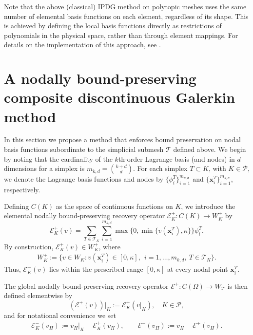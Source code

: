 \documentclass[11pt,final]{amsart}
\theoremstyle{plain}
\theoremstyle{definition}
\newcommand\bx{\boldsymbol{x}}
\newcommand\calP{{\mathcal{P}}}
\newcommand\calT{{\mathcal{T}}}
\begin{document}
Note that the above (classical) IPDG method on polytopic meshes uses
the same number of elemental basis functions on each element,
regardless of its shape. This is achieved by defining the local basis
functions directly as restrictions of polynomials in the physical
space, rather than through element mappings. For details on the
implementation of this approach, see \cite{cangiani2017hp}.


 
\section{A nodally bound-preserving composite discontinuous Galerkin method}
\label{Sec:NBP-poly}

In this section we propose a method that enforces bound preservation
on nodal basis functions subordinate to the simplicial submesh $\calT$
defined above. We begin by noting that the cardinality of the
$k$th-order Lagrange basis (and nodes) in $d$ dimensions for a simplex
is $m_{k,d}={k+d \choose d}$. For each simplex $T\subset K$, with
$K\in\calP$, we denote the Lagrange basis functions and nodes by
$\{\phi_i^T\}_{i=1}^{m_{k,d}}$ and $\{\bx_i^T\}_{i=1}^{m_{k,d}}$,
respectively.

Defining $C(K)$ as the space of continuous functions on $K$, we
introduce the elemental nodally bound-preserving recovery operator
$\mathcal{E}_{K}^+: C(K)\to W_{K}^+$ by
\begin{equation}
  \mathcal{E}_{K}^+(v)
  =\sum_{T\in\calT_K}\sum_{i=1}^{m_{k,d}}
   \max\!\big\{0,\min\{v(\bx_i^T),\kappa\}\big\}\phi_i^T.
\end{equation}
By construction, $\mathcal{E}_{K}^+(v)\in W_{K}^+$, where
\begin{align}
  W_{K}^{+}
  :=\{v\in W_{K} : v(\bx_{i}^T)\in[0,\kappa],
   \ \ i=1,\ldots,m_{k,d}, \ T\in\calT_K\}. \label{eq16}
\end{align}
Thus, $\mathcal{E}_{K}^+(v)$ lies within the prescribed range
$[0,\kappa]$ at every nodal point $\bx_i^T$.  

The global nodally bound-preserving recovery operator
$\mathcal{E}^+: C(\Omega)\to W_{\calT}$ is then defined elementwise by
\[
  (\mathcal{E}^+(v))|_K:= \mathcal{E}^+_K(v|_K), \quad K\in\calP,
\]
and for notational convenience we set
\begin{align}
  \mathcal{E}^{-}_{K}(v_{H}):=v_{H}|_K-\mathcal{E}_{K}^{+}(v_{H}),
  \qquad
  \mathcal{E}^{-}(v_{H}):=v_{H}-\mathcal{E}^{+}(v_{H}).
  \label{eq188}
\end{align}
\end{document}
